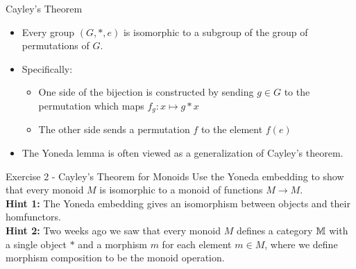 \begin{frame}{Cayley's Theorem}
\begin{itemize}
	\item Every group $(G, *, e)$ is isomorphic to a subgroup of the group of permutations of $G$.
	\pause\item Specifically:
	\begin{itemize}
		\item One side of the bijection is constructed by sending $g \in G$ to the permutation which maps $f_g : x \mapsto g * x$
		\item The other side sends a permutation $f$ to the element $f(e)$
	\end{itemize}
	\pause\item The Yoneda lemma is often viewed as a generalization of Cayley's theorem.
\end{itemize}
\end{frame}
\begin{frame}{Exercise 2 - Cayley's Theorem for Monoids}
	Use the Yoneda embedding to show that every monoid $M$ is isomorphic to a monoid of functions $M \to M$. 
	\\
	\textbf{Hint 1:} The Yoneda embedding gives an isomorphism between objects and their homfunctors. \\
	\textbf{Hint 2:} Two weeks ago we saw that every monoid $M$ defines a category $\mathbb{M}$ with a single object $*$ and a morphism $m$ for each element $m \in M$, where we define morphism composition to be the monoid operation.
\end{frame}
